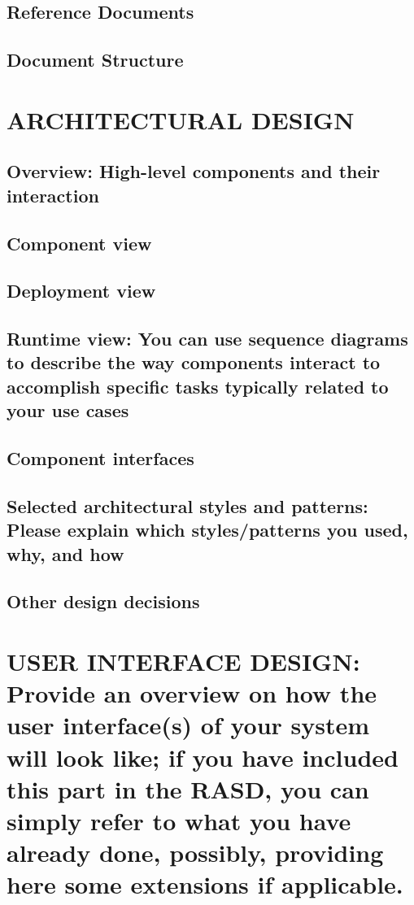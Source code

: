 \documentclass[12pt,a4paper]{article}
\begin{document}
\subsection{Reference Documents}
\subsection{Document Structure}

\section{ARCHITECTURAL DESIGN}
\subsection{Overview: High-level components and their interaction}
\subsection{Component view}
\subsection{Deployment view}
\subsection{Runtime view: You can use sequence diagrams to describe the way components interact to accomplish specific tasks typically related to your use cases}
\subsection{Component interfaces}
\subsection{Selected architectural styles and patterns: Please explain which styles/patterns you used, why, and how}
\subsection{Other design decisions}
\section{USER INTERFACE DESIGN: Provide an overview on how the user interface(s) of your system will look like; if you have included this part in the RASD, you can simply refer to what you have
already done, possibly, providing here some extensions if applicable.}
\end{document}

